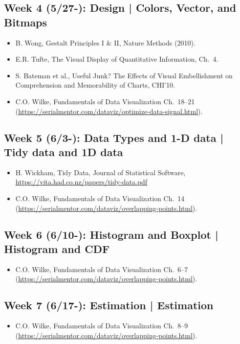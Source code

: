 \documentclass[11pt,article,oneside]{memoir} %
\begin{document}
\subsection{Week 4 (5/27-): Design | Colors, Vector, and Bitmaps }%

\begin{itemize}\itemsep0em 
\item B. Wong, Gestalt Principles I \& II, Nature Methods (2010). 
\item E.R. Tufte, The Visual Display of Quantitative Information, Ch.~4.
\item S. Bateman et al., Useful Junk? The Effects of Visual Embellishment on Comprehension and Memorability of Charts, CHI'10.
\item C.O. Wilke, Fundamentals of Data Visualization Ch.~18--21 (\url{https://serialmentor.com/dataviz/optimize-data-signal.html}). 
\end{itemize}	
\subsection{Week 5 (6/3-): Data Types and 1-D data | Tidy data and 1D data } %

\begin{itemize}\itemsep0em 
\item H. Wickham, Tidy Data, Journal of Statistical Software, \url{https://vita.had.co.nz/papers/tidy-data.pdf}
\item C.O. Wilke, Fundamentals of Data Visualization Ch.~14 (\url{https://serialmentor.com/dataviz/overlapping-points.html}). 
\end{itemize}	
\subsection{Week 6 (6/10-): Histogram and Boxplot | Histogram and CDF }%

\begin{itemize}\itemsep0em 
\item C.O. Wilke, Fundamentals of Data Visualization Ch.~6--7 (\url{https://serialmentor.com/dataviz/overlapping-points.html}). 
\end{itemize}	
\subsection{Week 7 (6/17-): Estimation | Estimation }%

\begin{itemize}\itemsep0em 
\item C.O. Wilke, Fundamentals of Data Visualization Ch.~8--9 (\url{https://serialmentor.com/dataviz/overlapping-points.html}). 
\end{itemize}	
\end{document}
